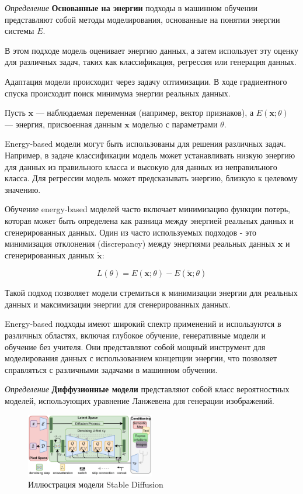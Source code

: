 \textit{Определение} \textbf{Основанные на энергии} подходы в машинном обучении представляют собой методы моделирования, основанные на понятии энергии системы $E$.

В этом подходе модель оценивает энергию данных, а затем использует эту оценку для различных задач, 
таких как классификация, регрессия или генерация данных.
 
Адаптация модели происходит через задачу оптимизации. В ходе градиентного спуска происходит поиск минимума энергии реальных данных.


Пусть \( \mathbf{x} \) — наблюдаемая переменная (например, вектор признаков),
 а \( E(\mathbf{x}; \theta) \) — энергия, присвоенная данным \( \mathbf{x} \) моделью с параметрами \( \theta \). 

Energy-based модели могут быть использованы для решения различных задач. Например, в задаче классификации модель может устанавливать низкую энергию для данных из правильного класса и высокую для данных из неправильного класса. Для регрессии модель может предсказывать энергию, близкую к целевому значению.

Обучение energy-based моделей часто включает минимизацию функции потерь, которая может быть определена как разница между энергией реальных данных и сгенерированных данных. Один из часто используемых подходов - это минимизация отклонения (discrepancy) между энергиями реальных данных \( \mathbf{x} \) и сгенерированных данных \( \tilde{\mathbf{x}} \):

\[ L(\theta) = E(\mathbf{x}; \theta) - E(\tilde{\mathbf{x}}; \theta) \]

Такой подход позволяет модели стремиться к минимизации энергии для реальных данных и максимизации энергии для сгенерированных данных.

Energy-based подходы имеют широкий спектр применений и используются в различных областях, включая глубокое обучение, генеративные модели и обучение без учителя. Они представляют собой мощный инструмент для моделирования данных с использованием концепции энергии, что позволяет справляться с различными задачами в машинном обучении.


\textit{Определение} \textbf{Диффузионные модели} \label{diffusion} представляют собой класс вероятностных моделей, 
использующих уравнение Ланжевена для генерации изображений.

\begin{figure}[h]
    \centering
    \includegraphics[width=0.5\textwidth]{assets/ml/generation/stable_diffusion.png}
    \caption{Иллюстрация модели Stable Diffusion \cite{stablediffusion}}
    \label{sd_arch}
\end{figure}

